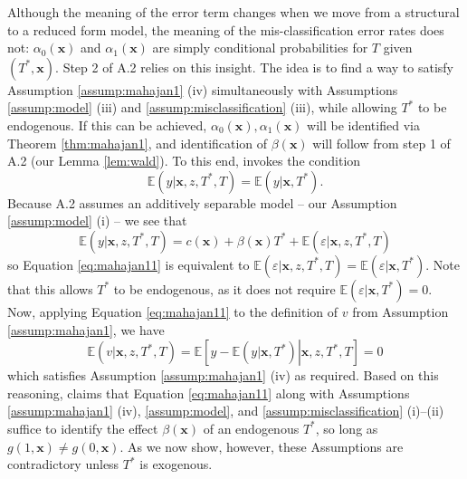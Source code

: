 Although the meaning of the error term changes when we move from a structural to a reduced form model, the meaning of the mis-classification error rates does not: $\alpha_0(\mathbf{x})$ and $\alpha_1(\mathbf{x})$ are simply conditional probabilities for $T$ given $(T^*,\mathbf{x})$.
Step 2 of \cite{Mahajan} A.2 relies on this insight.
The idea is to find a way to satisfy Assumption \ref{assump:mahajan1} (iv) simultaneously with Assumptions \ref{assump:model} (iii) and \ref{assump:misclassification} (iii), while allowing $T^*$ to be endogenous.
If this can be achieved, $\alpha_0(\mathbf{x}), \alpha_1(\mathbf{x})$ will be identified via Theorem \ref{thm:mahajan1}, and identification of $\beta(\mathbf{x})$ will follow from step 1 of A.2 (our Lemma \ref{lem:wald}).
To this end, \cite{Mahajan} invokes the condition 
\begin{equation}
  \mathbb{E}(y|\mathbf{x},z,T^*,T) = \mathbb{E}(y|\mathbf{x},T^*).
  \label{eq:mahajan11}
\end{equation}
Because \cite{Mahajan} A.2 assumes an additively separable model -- our Assumption \ref{assump:model} (i) -- we see that
\[
  \mathbb{E}(y|\mathbf{x},z,T^*,T) = c(\mathbf{x}) + \beta(\mathbf{x}) T^* + \mathbb{E}(\varepsilon|\mathbf{x},z,T^*,T)
\]
so Equation \ref{eq:mahajan11} is equivalent to $\mathbb{E}(\varepsilon|\mathbf{x},z,T^*,T)=\mathbb{E}(\varepsilon|\mathbf{x},T^*)$.
Note that this allows $T^*$ to be endogenous, as it does not require $\mathbb{E}(\varepsilon|\mathbf{x},T^*)=0$.
Now, applying Equation \ref{eq:mahajan11} to the definition of $v$ from Assumption \ref{assump:mahajan1}, we have
\[
  \mathbb{E}(v|\mathbf{x},z,T^*,T) = \mathbb{E}\left[ y - \mathbb{E}(y|\mathbf{x},T^*)\left. \right|\mathbf{x},z,T^*,T \right] = 0
\]
which satisfies Assumption \ref{assump:mahajan1} (iv) as required.
Based on this reasoning, \cite{Mahajan} claims that Equation \ref{eq:mahajan11} along with Assumptions \ref{assump:mahajan1} (iv), \ref{assump:model}, and \ref{assump:misclassification} (i)--(ii) suffice to identify the effect $\beta(\mathbf{x})$ of an endogenous $T^*$, so long as $g(1,\mathbf{x}) \neq g(0,\mathbf{x})$.
As we now show, however, these Assumptions are contradictory unless $T^*$ is exogenous.

